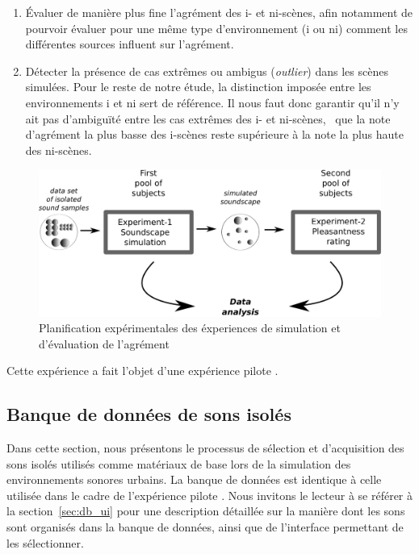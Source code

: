 \begin{enumerate}
\item Évaluer de manière plus fine l'agrément des i- et ni-scènes, afin notamment de pourvoir évaluer pour une même type d'environnement (i ou ni) comment les différentes sources influent sur l'agrément.
\item Détecter la présence de cas extrêmes ou ambigus (\emph{outlier}) dans les scènes simulées. Pour le reste de notre étude, la distinction imposée entre les environnements i et ni sert de référence. Il nous faut donc garantir qu'il n'y ait pas d’ambiguïté entre les cas extrêmes des i- et ni-scènes, \ie~que la note d'agrément la plus basse des i-scènes reste supérieure à la note la plus haute des ni-scènes.
\end{enumerate}

\begin{figure}[bth]
        \myfloatalign
        \includegraphics[width=.8\linewidth]{gfx/5-eps-converted-to}
        \caption{Planification expérimentales des éxperiences de simulation et d'évaluation de l'agrément}\label{fig:xp1_2}
\end{figure}

Cette expérience a fait l'objet d'une expérience pilote \citep{lafay2013atiam,lafay2014new}.

\subsection{Banque de données de sons isolés}

Dans cette section, nous présentons le processus de sélection et d'acquisition des sons isolés utilisés comme matériaux de base lors de la simulation des environnements sonores urbains. La banque de données est identique à celle utilisée dans le cadre de l'expérience pilote \citep{lafay2013atiam,lafay2014new}. Nous invitons le lecteur à se référer à la section~\ref{sec:db_ui} pour une description détaillée sur la manière dont les sons sont organisés dans la banque de données, ainsi que de l'interface permettant de les sélectionner. 

